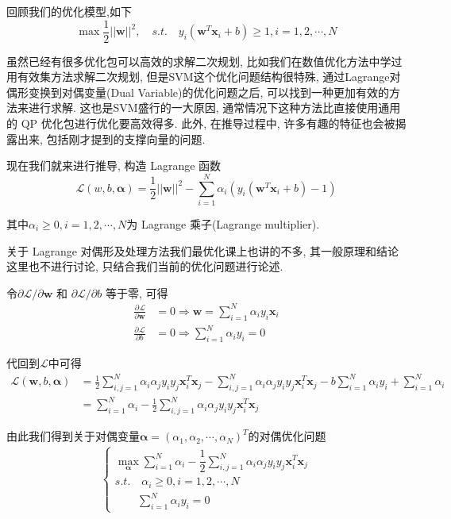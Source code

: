 \documentclass[a4paper,UTF8]{ctexart}
\theoremstyle{plain} \newtheorem{theorem}{定理}[section]
\theoremstyle{plain} \newtheorem{definition}{定义}[section]
\theoremstyle{plain} \newtheorem{lemma}{引理}[section]
\theoremstyle{plain} \newtheorem{proposition}{命题}[section]
\theoremstyle{plain} \newtheorem{example}{例}
\theoremstyle{plain} \newtheorem{remark}{注}
\theoremstyle{plain} \newtheorem{corollary}{推论}[section]
\newcommand{\p}[3]{\frac{\partial^{#1}#2}{\partial{#3}^{#1}}}  %
\begin{document}
回顾我们的优化模型,如下
\begin{equation*}
\max \frac{1}{2} ||\bm{w}||^{2}, \quad s.t. \quad y_{i} (\bm{w}^{T} \bm{x}_{i} + b) \geqslant 1, i = 1,2,\cdots,N
\end{equation*}

虽然已经有很多优化包可以高效的求解二次规划, 比如我们在数值优化方法中学过用有效集方法求解二次规划, 但是SVM这个优化问题结构很特殊, 通过Lagrange对偶形变换到对偶变量(Dual Variable)的优化问题之后, 可以找到一种更加有效的方法来进行求解. 这也是SVM盛行的一大原因, 通常情况下这种方法比直接使用通用的 QP 优化包进行优化要高效得多. 此外, 在推导过程中, 许多有趣的特征也会被揭露出来, 包括刚才提到的支撑向量的问题.

现在我们就来进行推导, 构造 Lagrange 函数
\begin{equation*}
\mathcal{L} (w,b,\bm{\alpha}) = \frac{1}{2} ||\bm{w}||^{2} - \sum_{i=1}^{N} \alpha_{i} \left( y_{i} (\bm{w}^{T} \bm{x}_{i} + b) - 1  \right)
\end{equation*}

其中$\alpha_{i} \geqslant 0, i = 1,2,\cdots,N$为 Lagrange 乘子(Lagrange multiplier).

关于 Lagrange 对偶形及处理方法我们最优化课上也讲的不多, 其一般原理和结论这里也不进行讨论, 只结合我们当前的优化问题进行论述.

令$\partial \mathcal{L} / \partial \bm{w}$ 和 $\partial \mathcal{L} / \partial b$ 等于零, 可得
\begin{align*}
\p{}{\mathcal{L}}{\bm{w}}  & = 0 \Rightarrow \bm{w} = \sum_{i=1}^{N} \alpha_{i} y_{i} \bm{x}_{i} \\ 
\p{}{\mathcal{L}}{b} &  = 0 \Rightarrow \sum_{i=1}^{N} \alpha_{i} y_{i} = 0
\end{align*}

代回到$\mathcal{L}$中可得
\begin{align*}
\mathcal{L}(\bm{w},b,\bm{\alpha}) & = \frac{1}{2} \sum_{i,j=1}^{N} \alpha_{i} \alpha_{j} y_{i} y_{j} \bm{x}_{i}^{T} \bm{x}_{j} - \sum_{i,j=1}^{N} \alpha_{i} \alpha_{j} y_{i} y_{j} \bm{x}_{i}^{T} \bm{x}_{j} - b \sum_{i=1}^{N} \alpha_{i} y_{i} + \sum_{i=1}^{N} \alpha_{i} \\ 
& = \sum_{i=1}^{N} \alpha_{i} - \frac{1}{2} \sum_{i,j=1}^{N} \alpha_{i} \alpha_{j} y_{i} y_{j} \bm{x}_{i}^{T} \bm{x}_{j}
\end{align*}

由此我们得到关于对偶变量$\bm{\alpha} = (\alpha_1,\alpha_2,\cdots,\alpha_{N})^{T}$的对偶优化问题
\begin{align*}
\begin{cases}
\max\limits_{\bm{\alpha}}  \sum\limits_{i=1}^{N} \alpha_{i} - \dfrac{1}{2} \sum\limits_{i,j=1}^{N} \alpha_{i} \alpha_{j} y_{i} y_{j} \bm{x}_{i}^{T} \bm{x}_{j} \\ 
s.t. \quad \alpha_{i} \geqslant 0, i=1,2,\cdots,N \\ 
\qquad \sum\limits_{i=1}^{N} \alpha_{i} y_{i} = 0
\end{cases}
\end{align*}
\end{document}
